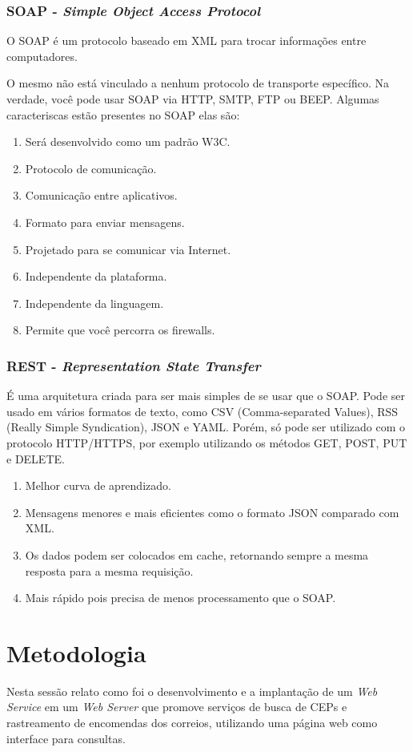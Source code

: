 \documentclass[12pt]{article}
\begin{document}
\subsubsection{SOAP - \textit{Simple Object Access Protocol}}

O SOAP é um protocolo baseado em XML para trocar informações entre computadores.

O mesmo não está vinculado a nenhum protocolo de transporte específico. Na verdade, você pode usar SOAP via HTTP, SMTP, FTP ou BEEP. 
Algumas caracteriscas estão presentes no SOAP elas são:
\begin{enumerate}
	\item Será desenvolvido como um padrão W3C.
	\item Protocolo de comunicação.
	\item Comunicação entre aplicativos.
	\item Formato para enviar mensagens.
	\item Projetado para se comunicar via Internet.
	\item Independente da plataforma.
	\item Independente da linguagem.
	\item Permite que você percorra os firewalls.
\end{enumerate}
\subsubsection{REST - \textit{Representation State Transfer}}
É uma arquitetura criada para ser mais simples de se usar que o SOAP. Pode ser usado em vários formatos de texto, como CSV (Comma-separated Values), RSS (Really Simple Syndication), JSON e YAML. Porém, só pode ser utilizado com o protocolo HTTP/HTTPS, por exemplo utilizando os métodos GET, POST, PUT e DELETE. 

\begin{enumerate}
	\item Melhor curva de aprendizado.
	\item Mensagens menores e mais eficientes como o formato JSON comparado com XML.
	\item Os dados podem ser colocados em cache, retornando sempre a mesma resposta para a mesma requisição.
	\item Mais rápido pois precisa de menos processamento que o SOAP.
\end{enumerate}

\section{Metodologia}
Nesta sessão relato como foi o desenvolvimento e a implantação de um \textit{Web Service} em um \textit{Web Server} que promove serviços de busca de CEPs e rastreamento de encomendas dos correios, utilizando uma página web como interface para consultas.
 
\end{document}
